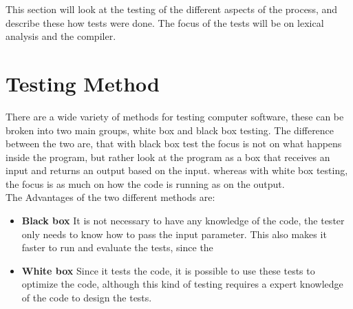 This section will look at the testing of the different aspects of the process, and describe these how tests were done. The focus of the tests will be on lexical analysis and the compiler.

\section{Testing Method}
There are a wide variety of methods for testing computer software, these can be broken into two main groups, white box and black box testing. The difference between the two are, that with black box test the focus is not on what happens inside the program, but rather look at the program as a box that receives an input and returns an output based on the input. whereas with white box testing, the focus is as much on how the code is running as on the output.\\

The Advantages of the two different methods are:
\begin{itemize}
\item[] \textbf{Black box} It is not necessary to have any knowledge of the code, the tester only needs to know how to pass the input parameter. This also makes it faster to run and evaluate the tests, since the 
\item[] \textbf{White box} Since it tests the code, it is possible to use these tests to optimize the code, although this kind of testing requires a expert knowledge of the code to design the tests. 
\end{itemize}

